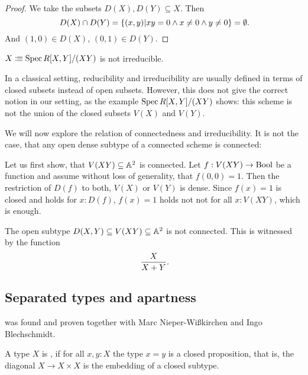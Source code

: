 \begin{proof}
  We take the subsets $D(X),D(Y)\subseteq X$.
  Then
  \[ D(X)\cap D(Y)=\{(x,y)\vert xy=0\wedge x\neq 0\wedge y\neq 0\}=\emptyset\rlap{.} \]
  And $(1,0)\in D(X)$, $(0,1)\in D(Y)$.
\end{proof}

\begin{example}
  $X\vcentcolon\mspace{-1.2mu}\equiv \operatorname{Spec} R[X,Y]/(XY)$ is not irreducible.
\end{example}

\begin{remark}
  In a classical setting,
  reducibility and irreducibility are usually defined
  in terms of closed subsets instead of open subsets.
  However, this does not give the correct notion in our setting,
  as the example $\operatorname{Spec} R[X, Y]/(XY)$ shows:
  this scheme is not the union of the closed subsets $V(X)$ and $V(Y)$.
\end{remark}

We will now explore the relation of connectedness and irreducibility.
It is not the case, that any open dense subtype of a connected scheme is connected:

\begin{example}
  Let us first show,
  that $V(XY)\subseteq \mathbb{A}^2$ is connected.
  Let $f:V(XY)\to \mathrm{Bool}$ be a function and assume without loss of generality,
  that $f(0,0)=1$.
  Then the restriction of $D(f)$ to both, $V(X)$ or $V(Y)$ is dense.
  Since $f(x)=1$ is closed and holds for $x:D(f)$, $f(x)=1$ holds not not for all $x:V(XY)$,
  which is enough.
    
  The open subtype $D(X,Y)\subseteq V(XY)\subseteq \mathbb{A}^2$ is not connected.
  This is witnessed by the function
  \[
    \frac{X}{X+Y}
    \rlap{.}
  \]
\end{example}

\subsection{Separated types and apartness}

 was found and proven together with Marc Nieper-Wißkirchen and Ingo Blechschmidt.

\begin{definition}%
  A type $X$ is , if for all $x,y:X$
  the type $x=y$ is a closed proposition,
  that is,
  the diagonal $X \to X\times X$ is the embedding of a closed subtype.
\end{definition}

